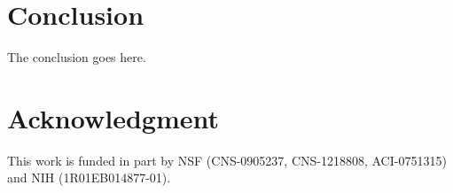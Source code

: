 \documentclass[conference,compsoc]{IEEEtran}
\begin{document}
\vspace{-0.1in}
\section{Conclusion}
\vspace{-0.1in}
The conclusion goes here.

\vspace{-0.1in}
\section*{Acknowledgment}
\vspace{-0.1in}
This work is funded in part by NSF (CNS-0905237, CNS-1218808, ACI-0751315) and NIH
(1R01EB014877-01).

\vspace{-0.1in}

%

\end{document}
